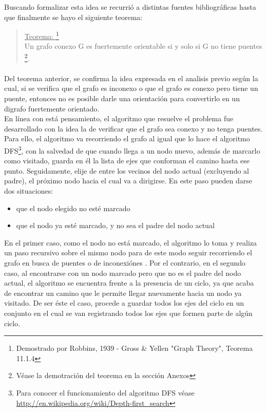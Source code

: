 Buscando formalizar esta idea se recurrió a distintas fuentes bibliográficas hasta que finalmente se hayo el siguiente teorema:

\begin{quote}
\label{robbins}
\underline{Teorema: }\footnote{Demostrado por Robbins, 1939 - Gross \& Yellen "Graph Theory", Teorema 11.1.4}\\ \vspace{7pt}
Un grafo conexo G es fuertemente orientable si y solo si G no tiene puentes \footnote{Véase la demotración del teorema en la sección Anexos}.
\end{quote}

\paragraph{} 
Del teorema anterior, se confirma la idea expresada en el analisis previo según la cual, si se verifica que el grafo es inconexo o que el grafo es conexo pero tiene un puente, entonces no es posible darle una orientación para convertirlo en un digrafo fuertemente orientado.\\
En línea con está pensamiento, el algoritmo que resuelve el problema fue desarrollado con la idea la de verificar que el grafo sea conexo y no tenga puentes. Para ello, el algoritmo va recorriendo el grafo al igual que lo hace el algoritmo DFS\footnote{Para conocer el funcionamiento del algoritmo DFS véase \url{http://en.wikipedia.org/wiki/Depth-first_search}}, con la salvedad de que cuando llega a un nodo nuevo, además de marcarlo como visitado, guarda en él la lista de ejes que conforman el camino hasta ese punto. Seguidamente, elije de entre los vecinos del nodo actual (excluyendo al padre), el próximo nodo hacia el cual va a dirigirse. En este paso pueden darse dos situaciones: 
\begin{itemize}
	\item que el nodo elegido no esté marcado
	\item que el nodo ya esté marcado, y no sea el padre del nodo actual
\end{itemize}
En el primer caso, como el nodo no está marcado, el algoritmo lo toma y realiza un paso recursivo sobre el mismo nodo para de este modo seguir recorriendo el grafo en busca de puentes o de inconexiónes . Por el contrario, en el segundo caso, al encontrarse con un nodo marcado pero que no es el padre del nodo actual, el algoritmo se encuentra frente a la presencia de un ciclo, ya que acaba de encontrar un camino que le permite llegar nuevamente hacia un nodo ya visitado. De ser éste el caso, procede a guardar todos los ejes del ciclo en un conjunto en el cual se van registrando todos los ejes que formen parte de algún ciclo.
